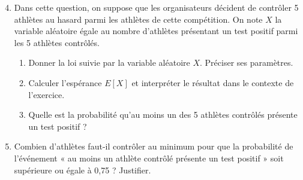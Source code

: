 \documentclass[11pt,fleqn, openany]{book} %
\begin{document}
\begin{exercise}[subtitle={(Amérique du Nord 2021)}]
\begin{enumerate}
\setcounter{enumi}{3}
\item Dans cette question, on suppose que les organisateurs décident de contrôler 5 athlètes au hasard parmi les athlètes de cette compétition. On note $X$ la variable aléatoire égale au nombre d'athlètes présentant un test
positif parmi les 5 athlètes contrôlés. 
\begin{enumerate}
\item Donner la loi suivie par la variable aléatoire $X$. Préciser ses paramètres.
\item Calculer l'espérance $E[X]$ et interpréter le résultat dans le contexte de l'exercice.
\item Quelle est la probabilité qu'au moins un des 5 athlètes contrôlés présente un test positif ?
\end{enumerate} 
\item Combien d'athlètes faut-il contrôler au minimum pour que la probabilité de l'événement « au moins un athlète contrôlé présente un test positif » soit supérieure ou égale à 0,75 ? Justifier.\end{enumerate}


\end{exercise}
\end{document}
